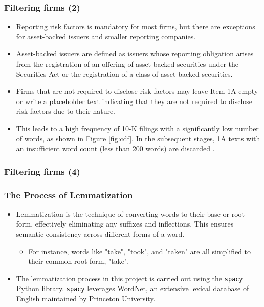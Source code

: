 \documentclass{beamer}
\newcommand{\ffo}{dicfullmc10thr10defnob40noa1_4t}
\begin{document}
\begin{frame}
\frametitle{Filtering firms (2)}
\begin{itemize}
\item Reporting risk factors is mandatory for most firms, but there are exceptions for asset-backed issuers and smaller reporting companies.
\item Asset-backed issuers are defined as issuers whose reporting obligation arises from the registration of an offering of asset-backed securities under the Securities Act or the registration of a class of asset-backed securities.
\item Firms that are not required to disclose risk factors may leave Item 1A empty or write a placeholder text indicating that they are not required to disclose risk factors due to their nature.
\item This leads to a high frequency of 10-K filings with a significantly low number of words, as shown in Figure \ref{fig:cdf}. In the subsequent stages, 1A texts with an insufficient word count (less than 200 words) are discarded \hyperlink{min_words}{}.

\end{itemize}
\end{frame}


\begin{frame}
\frametitle{Filtering firms (4)}
\scriptsize

\end{frame}


\begin{frame}
\frametitle{The Process of Lemmatization}
\begin{itemize}
\item Lemmatization is the technique of converting words to their base or root form, effectively eliminating any suffixes and inflections. This ensures semantic consistency across different forms of a word.
\begin{itemize}
  \item For instance, words like "take", "took", and "taken" are all simplified to their common root form, "take".
\end{itemize}
\item The lemmatization process in this project is carried out using the \texttt{spacy} Python library. \texttt{spacy} leverages WordNet, an extensive lexical database of English maintained by Princeton University. 
\end{itemize}
\end{frame}
\end{document}
